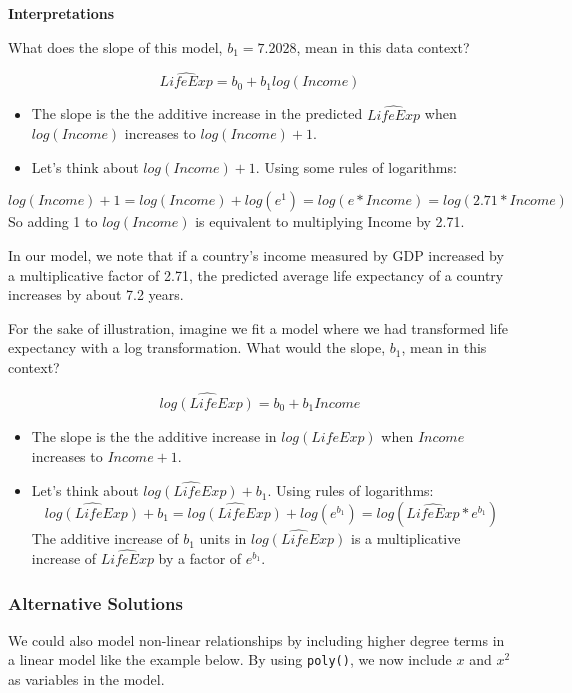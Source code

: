 \documentclass[]{book}
\begin{document}
\textbf{Interpretations}

What does the slope of this model, \(b_1 = 7.2028\), mean in this data context?

\[\widehat{LifeExp} = b_0 + b_1 log(Income)\]

\begin{itemize}
\item
  The slope is the the additive increase in the predicted \(\widehat{LifeExp}\) when \(log(Income)\) increases to \(log(Income) + 1\).
\item
  Let's think about \(log(Income) + 1\). Using some rules of logarithms:
\end{itemize}

\[log(Income) + 1 = log(Income) + log(e^1) = log(e*Income) = log(2.71*Income)\]
So adding 1 to \(log(Income)\) is equivalent to multiplying Income by 2.71.

In our model, we note that if a country's income measured by GDP increased by a multiplicative factor of 2.71, the predicted average life expectancy of a country increases by about 7.2 years.

For the sake of illustration, imagine we fit a model where we had transformed life expectancy with a log transformation. What would the slope, \(b_1\), mean in this context?

\[\widehat{log(LifeExp)} = b_0 + b_1 Income\]

\begin{itemize}
\item
  The slope is the the additive increase in \(\widehat{log(LifeExp)}\) when \(Income\) increases to \(Income + 1\).
\item
  Let's think about \(\widehat{log(LifeExp)} + b_1\). Using rules of logarithms:
  \[\widehat{log(LifeExp)} + b_1 = \widehat{log(LifeExp)} + log(e^{b_1}) = log(\widehat{LifeExp} * e^{b_1}) \]
  The additive increase of \(b_1\) units in \(\widehat{log(LifeExp)}\) is a multiplicative increase of \(\widehat{LifeExp}\) by a factor of \(e^{b_1}\).
\end{itemize}

\hypertarget{alternative-solutions}{%
\subsubsection{Alternative Solutions}\label{alternative-solutions}}

We could also model non-linear relationships by including higher degree terms in a linear model like the example below. By using \texttt{poly()}, we now include \(x\) and \(x^2\) as variables in the model.
\end{document}
